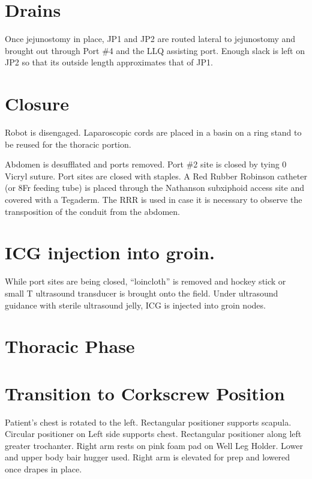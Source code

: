 \documentclass[
  letterpaper,
]{scrbook}
\begin{document}
\section{Drains}\label{drains-1}

Once jejunostomy in place, JP1 and JP2 are routed lateral to jejunostomy
and brought out through Port \#4 and the LLQ assisting port. Enough
slack is left on JP2 so that its outside length approximates that of
JP1.

\section{Closure}\label{closure-2}

Robot is disengaged. Laparoscopic cords are placed in a basin on a ring
stand to be reused for the thoracic portion.

Abdomen is desufflated and ports removed. Port \#2 site is closed by
tying 0 Vicryl suture. Port sites are closed with staples. A Red Rubber
Robinson catheter (or 8Fr feeding tube) is placed through the Nathanson
subxiphoid access site and covered with a Tegaderm. The RRR is used in
case it is necessary to observe the transposition of the conduit from
the abdomen.

\section{ICG injection into groin.}\label{icg-injection-into-groin.-1}

While port sites are being closed, ``loincloth'' is removed and hockey
stick or small T ultrasound transducer is brought onto the field. Under
ultrasound guidance with sterile ultrasound jelly, ICG is injected into
groin nodes.

\section{Thoracic Phase}\label{thoracic-phase-1}

\section{Transition to Corkscrew
Position}\label{transition-to-corkscrew-position}

Patient's chest is rotated to the left. Rectangular positioner supports
scapula. Circular positioner on Left side supports chest. Rectangular
positioner along left greater trochanter. Right arm rests on pink foam
pad on Well Leg Holder. Lower and upper body bair hugger used. Right arm
is elevated for prep and lowered once drapes in place.
\end{document}
